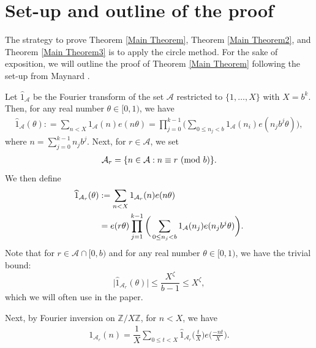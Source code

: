 \documentclass[12pt]{amsart}
\numberwithin{equation}{section}
\theoremstyle{remark}
\theoremstyle{definition}
\newcommand{\imod}[1]{\ (\mathrm{mod}\ #1)}
\begin{document}
\begin{center}

\end{center}


\section{Set-up and outline of the proof}\label{Setup}
The strategy to prove Theorem \ref{Main Theorem}, Theorem \ref{Main Theorem2}, and Theorem \ref{Main Theorem3} is to apply the circle method. For the sake of exposition, we will outline the proof of Theorem \ref{Main Theorem} following the set-up from Maynard \cite{May2}.


Let $\widehat{{1}}_{\mathcal{A}}$ be the Fourier transform of the set $\mathcal{A}$ restricted to $\{1, \dotsc, X\}$ with $X=b^k$. Then, for any real number $\theta\in [0, 1)$, we have
\begin{align}\label{Afourier}
\widehat{{1}}_{\mathcal{A}}(\theta): =\sum_{n<X}{1}_{\mathcal{A}}(n)e(n\theta) = \prod_{j=0}^{k-1}\bigg(\sum_{0\leq n_j<b}{1}_{\mathcal{A}}(n_i)e(n_jb^j \theta)\bigg),
\end{align}
where $n=\sum_{j=0}^{k-1}n_jb^j$. Next, for $r\in \mathcal{A}$, we set
\begin{align}
\notag \mathcal{A}_r=\{n\in \mathcal{A}:n\equiv r\imod b\}.
\end{align}
We then define 
\begin{align}
\label{Arfourier}\widehat{1}_{\mathcal{A}_r}(\theta)&:=\sum_{n<X}{1}_{\mathcal{A}_r}(n)e(n\theta)\\
\notag &=e(r\theta)\prod_{j=1}^{k-1}\bigg(\sum_{0\leq n_j<b}{1}_{\mathcal{A}}(n_j)e(n_jb^j \theta)\bigg).
\end{align}
Note that for $r\in \mathcal{A} \cap[0, b)$ and for any real number $\theta\in [0, 1)$, we have the trivial bound:
\[\big|\widehat{1}_{\mathcal{A}_r}(\theta)\big| \leq \dfrac{X^\zeta}{b-1} \leq X^\zeta,\]
which we will often use in the paper.

Next, by Fourier inversion on $\mathbb{Z}/X\mathbb{Z}$, for $n<X$, we have
\begin{align}
\label{fourinv} {1}_{\mathcal{A}_r}(n) = \dfrac{1}{X}\sum_{0\leq t < X}\widehat{{1}}_{\mathcal{A}_r}\bigg(\frac{t}{X}\bigg)e\bigg(\frac{-nt}{X}\bigg).
\end{align}
\end{document}
